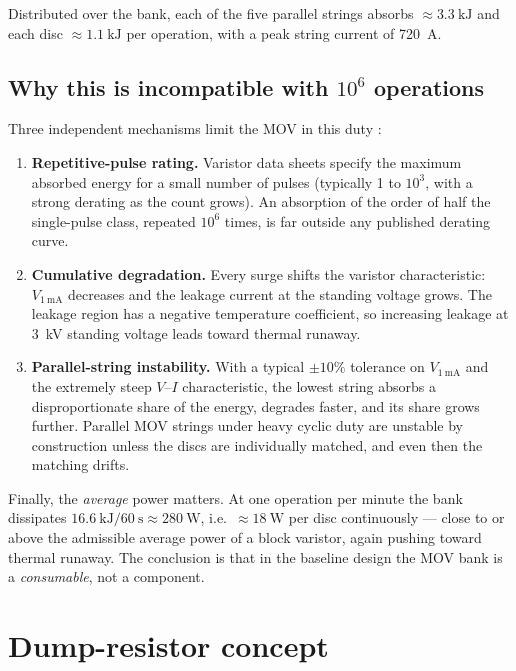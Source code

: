 \documentclass[11pt,a4paper]{article}
\begin{document}
Distributed over the bank, each of the five parallel strings absorbs
$\approx\SI{3.3}{\kilo\joule}$ and each disc $\approx\SI{1.1}{\kilo\joule}$
per operation, with a peak string current of \SI{720}{\ampere}.

\subsection{Why this is incompatible with $10^6$ operations}

Three independent mechanisms limit the MOV in this duty \cite{siov}:

\begin{enumerate}
\item \textbf{Repetitive-pulse rating.} Varistor data sheets specify the
maximum absorbed energy for a small number of pulses (typically 1 to
$10^3$, with a strong derating as the count grows). An absorption of the
order of half the single-pulse class, repeated $10^6$ times, is far outside
any published derating curve.
\item \textbf{Cumulative degradation.} Every surge shifts the varistor
characteristic: $V_{\SI{1}{\milli\ampere}}$ decreases and the leakage current
at the standing voltage grows. The leakage region has a negative temperature
coefficient, so increasing leakage at \SI{3}{\kilo\volt} standing voltage
leads toward thermal runaway.
\item \textbf{Parallel-string instability.} With a typical $\pm 10\%$
tolerance on $V_{\SI{1}{\milli\ampere}}$ and the extremely steep $V$--$I$
characteristic, the lowest string absorbs a disproportionate share of the
energy, degrades faster, and its share grows further. Parallel MOV strings
under heavy cyclic duty are unstable by construction unless the discs are
individually matched, and even then the matching drifts.
\end{enumerate}

Finally, the \emph{average} power matters. At one operation per minute the
bank dissipates $\SI{16.6}{\kilo\joule}/\SI{60}{\second}\approx\SI{280}{\watt}$,
i.e.\ $\approx\SI{18}{\watt}$ per disc continuously --- close to or above the
admissible average power of a block varistor, again pushing toward thermal
runaway. The conclusion is that in the baseline design the MOV bank is a
\emph{consumable}, not a component.

\section{Dump-resistor concept}
\label{sec:concept}
\end{document}
